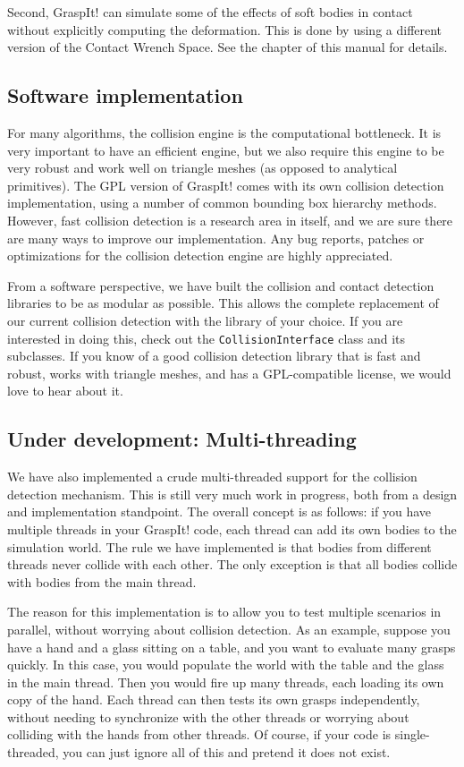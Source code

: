 Second, GraspIt! can simulate some of the effects of soft bodies in
contact without explicitly computing the deformation. This is done by
using a different version of the Contact Wrench Space. See the
 chapter of this manual for
details.

\subsection{Software implementation}

For many algorithms, the collision engine is the computational
bottleneck. It is very important to have an efficient engine, but we
also require this engine to be very robust and work well on triangle
meshes (as opposed to analytical primitives). The GPL version of
GraspIt! comes with its own collision detection implementation, using
a number of common bounding box hierarchy methods. However, fast
collision detection is a research area in itself, and we are sure
there are many ways to improve our implementation. Any bug reports,
patches or optimizations for the collision detection engine are highly
appreciated.

From a software perspective, we have built the collision and contact
detection libraries to be as modular as possible. This allows the
complete replacement of our current collision detection with the
library of your choice. If you are interested in doing this, check out
the \texttt{CollisionInterface} class and its subclasses. If you know
of a good collision detection library that is fast and robust, works
with triangle meshes, and has a GPL-compatible license, we would love
to hear about it.

\subsection{Under development: Multi-threading}

We have also implemented a crude multi-threaded support for the
collision detection mechanism. This is still very much work in
progress, both from a design and implementation standpoint. The overall
concept is as follows: if you have multiple threads in your GraspIt!
code, each thread can add its own bodies to the simulation world. The
rule we have implemented is that bodies from different threads never
collide with each other. The only exception is that all bodies collide
with bodies from the main thread.

The reason for this implementation is to allow you to test multiple
scenarios in parallel, without worrying about collision detection. As
an example, suppose you have a hand and a glass sitting on a table,
and you want to evaluate many grasps quickly. In this case, you would
populate the world with the table and the glass in the main
thread. Then you would fire up many threads, each loading its own copy
of the hand. Each thread can then tests its own grasps independently,
without needing to synchronize with the other threads or worrying
about colliding with the hands from other threads. Of course, if your
code is single-threaded, you can just ignore all of this and pretend
it does not exist.

